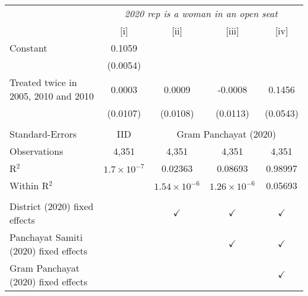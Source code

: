 
\begingroup
\centering
\begin{tabular}{lcccc}
   \toprule
    & \multicolumn{4}{c}{\textit{2020 rep is a woman in an open seat}}\\
                                         & [i]                  & [ii]                  & [iii]                 & [iv]\\  
   \midrule 
   Constant                              & 0.1059               &                       &                       &   \\   
                                         & (0.0054)             &                       &                       &   \\   
   Treated twice in 2005, 2010 and 2010  & 0.0003               & 0.0009                & -0.0008               & 0.1456\\   
                                         & (0.0107)             & (0.0108)              & (0.0113)              & (0.0543)\\   
    \\
   Standard-Errors & IID & \multicolumn{3}{c}{Gram Panchayat (2020)} \\ 
   Observations                          & 4,351                & 4,351                 & 4,351                 & 4,351\\  
   R$^2$                                 & $1.7\times 10^{-7}$  & 0.02363               & 0.08693               & 0.98997\\  
   Within R$^2$                          &                      & $1.54\times 10^{-6}$  & $1.26\times 10^{-6}$  & 0.05693\\  
    \\
   District (2020) fixed effects         &                      & $\checkmark$          & $\checkmark$          & $\checkmark$\\   
   Panchayat Samiti (2020) fixed effects &                      &                       & $\checkmark$          & $\checkmark$\\   
   Gram Panchayat (2020) fixed effects   &                      &                       &                       & $\checkmark$\\   
   \bottomrule
\end{tabular}
\par\endgroup


